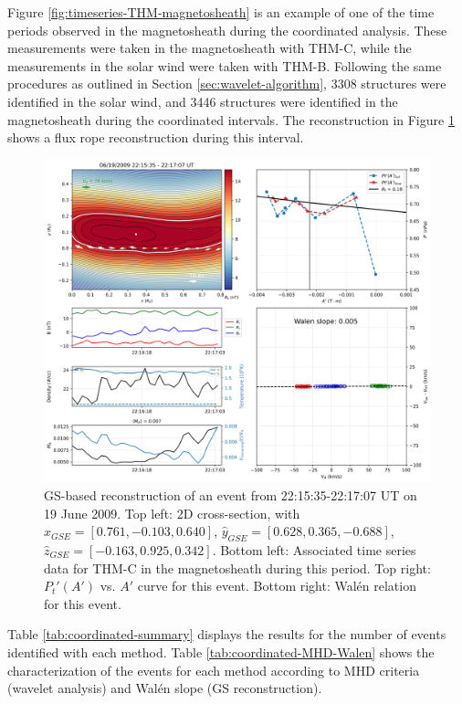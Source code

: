 Figure \ref{fig:timeseries-THM-magnetosheath} is an example of one of the time periods observed in the magnetosheath during the coordinated analysis. These measurements were taken in the magnetosheath with THM-C, while the measurements in the solar wind were taken with THM-B. Following the same procedures as outlined in Section \ref{sec:wavelet-algorithm}, 3308 structures were identified in the solar wind, and 3446 structures were identified in the magnetosheath during the coordinated intervals. The reconstruction in Figure \ref{fig:reconstruction-June2009} shows a flux rope reconstruction during this interval. 

\begin{figure}
    \centering
    \includegraphics[width=\textwidth]{Figures/Reconstructions/timeseries_walenTest_20090619_20090621.png}
    \caption[GS event reconstruction]{GS-based reconstruction of an event from 22:15:35-22:17:07 UT on 19 June 2009. Top left: 2D cross-section, with $\hat{x}_{GSE}=[0.761, -0.103, 0.640]$, $\hat{y}_{GSE}=[0.628, 0.365, -0.688]$, $\hat{z}_{GSE}=[-0.163,0.925,0.342]$. Bottom left: Associated time series data for THM-C in the magnetosheath during this period. Top right: $P_t'(A')$ vs. $A'$ curve for this event. Bottom right: Wal\'en relation for this event.}
    \label{fig:reconstruction-June2009}
\end{figure}


Table \ref{tab:coordinated-summary} displays the results for the number of events identified with each method. Table \ref{tab:coordinated-MHD-Walen} shows the characterization of the events for each method according to MHD criteria (wavelet analysis) and Wal\'en slope (GS reconstruction).

